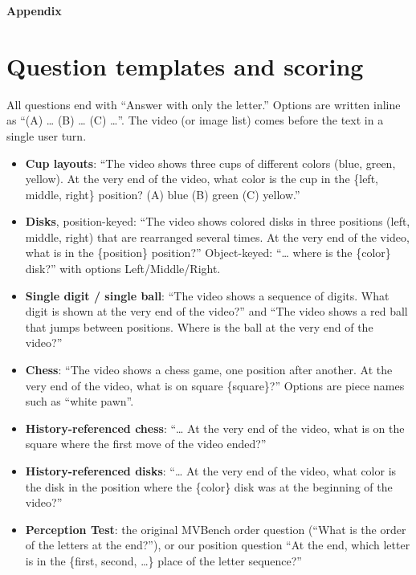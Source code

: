 \clearpage
\appendix
\onecolumn
\setcounter{table}{0}
\renewcommand{\thetable}{A\arabic{table}}

\begin{center}
  {\Large\bfseries Appendix}
\end{center}

\section{Question templates and scoring}
\label{app:prompts}

All questions end with ``Answer with only the letter.'' Options are written inline as ``(A) \dots{} (B) \dots{} (C) \dots''. The video (or image list) comes before the text in a single user turn.

\begin{itemize}
  \item \textbf{Cup layouts}: ``The video shows three cups of different colors (blue, green, yellow). At the very end of the video, what color is the cup in the \{left, middle, right\} position? (A) blue (B) green (C) yellow.''
  \item \textbf{Disks}, position-keyed: ``The video shows colored disks in three positions (left, middle, right) that are rearranged several times. At the very end of the video, what is in the \{position\} position?'' Object-keyed: ``\dots{} where is the \{color\} disk?'' with options Left/Middle/Right.
  \item \textbf{Single digit / single ball}: ``The video shows a sequence of digits. What digit is shown at the very end of the video?'' and ``The video shows a red ball that jumps between positions. Where is the ball at the very end of the video?''
  \item \textbf{Chess}: ``The video shows a chess game, one position after another. At the very end of the video, what is on square \{square\}?'' Options are piece names such as ``white pawn''.
  \item \textbf{History-referenced chess}: ``\dots{} At the very end of the video, what is on the square where the first move of the video ended?''
  \item \textbf{History-referenced disks}: ``\dots{} At the very end of the video, what color is the disk in the position where the \{color\} disk was at the beginning of the video?''
  \item \textbf{Perception Test}: the original MVBench order question (``What is the order of the letters at the end?''), or our position question ``At the end, which letter is in the \{first, second, \dots\} place of the letter sequence?''
\end{itemize}

